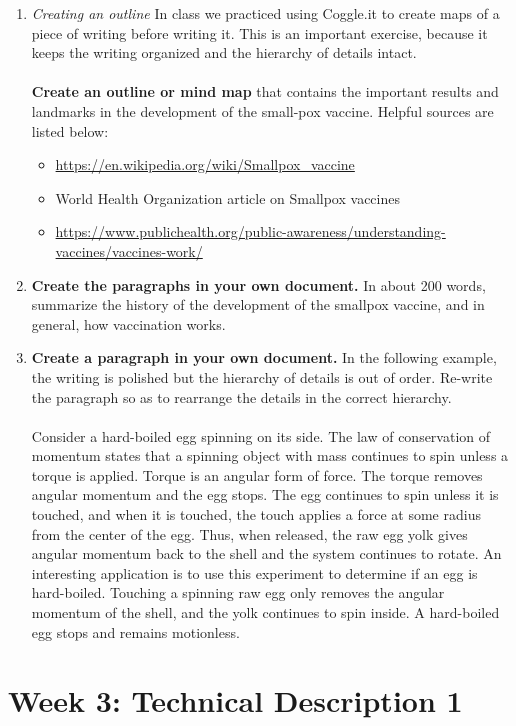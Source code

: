 \documentclass{article}
\begin{document}
\begin{enumerate}
\item \textit{Creating an outline} In class we practiced using Coggle.it to create maps of a piece of writing before writing it.  This is an important exercise, because it keeps the writing organized and the hierarchy of details intact.  \\ \\
\textbf{Create an outline or mind map} that contains the important results and landmarks in the development of the small-pox vaccine.  Helpful sources are listed below:
\begin{itemize}
\item \url{https://en.wikipedia.org/wiki/Smallpox_vaccine}
\item World Health Organization article on Smallpox vaccines
\item \url{https://www.publichealth.org/public-awareness/understanding-vaccines/vaccines-work/}
\end{itemize}
\item \textbf{Create the paragraphs in your own document.} In about 200 words, summarize the history of the development of the smallpox vaccine, and in general, how vaccination works.
\item \textbf{Create a paragraph in your own document.}  In the following example, the writing is polished but the hierarchy of details is out of order.  Re-write the paragraph so as to rearrange the details in the correct hierarchy. \\ \\

Consider a hard-boiled egg spinning on its side.  The law of conservation of momentum states that a spinning object with mass continues to spin unless a torque is applied.  Torque is an angular form of force.  The torque removes angular momentum and the egg stops.   The egg continues to spin unless it is touched, and when it is touched, the touch applies a force at some radius from the center of the egg.  Thus, when released, the raw egg yolk gives angular momentum back to the shell and the system continues to rotate.  An interesting application is to use this experiment to determine if an egg is hard-boiled.  Touching a spinning raw egg only removes the angular momentum of the shell, and the yolk continues to spin inside.  A hard-boiled egg stops and remains motionless.
\end{enumerate}

\section{Week 3: Technical Description 1}
\end{document}
